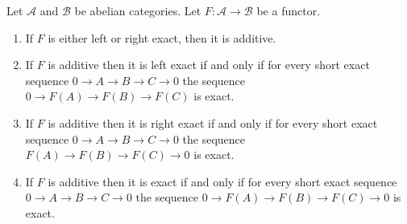 \begin{lemma}
\label{lemma-exact-functor}
Let $\mathcal{A}$ and $\mathcal{B}$ be abelian categories.
Let $F : \mathcal{A} \to \mathcal{B}$ be a functor.
\begin{enumerate}
\item If $F$ is either left or right exact, then it is additive.
\item If $F$ is additive then it is left exact if and only if
for every short exact sequence
$0 \to A \to B \to C \to 0$
the sequence $0 \to F(A) \to F(B) \to F(C)$
is exact.
\item If $F$ is additive then it is right exact if and only if
for every short exact sequence
$0 \to A \to B \to C \to 0$
the sequence $F(A) \to F(B) \to F(C) \to 0$
is exact.
\item If $F$ is additive then it is exact if and only if
for every short exact sequence
$0 \to A \to B \to C \to 0$
the sequence $0 \to F(A) \to F(B) \to F(C) \to 0$
is exact.
\end{enumerate}
\end{lemma}

